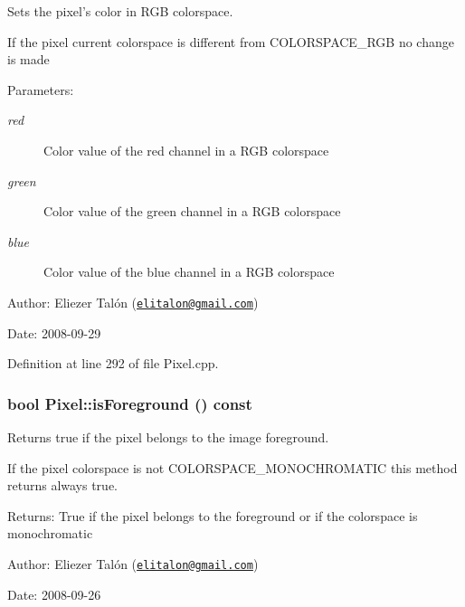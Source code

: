 Sets the pixel's color in RGB colorspace. 

If the pixel current colorspace is different from COLORSPACE\_\-RGB no change is made

\begin{Desc}
\item[Parameters:]
\begin{description}
\item[{\em red}]Color value of the red channel in a RGB colorspace \item[{\em green}]Color value of the green channel in a RGB colorspace \item[{\em blue}]Color value of the blue channel in a RGB colorspace\end{description}
\end{Desc}
\begin{Desc}
\item[Author:]Eliezer Talón (\href{mailto:elitalon@gmail.com}{\tt elitalon@gmail.com}) \end{Desc}
\begin{Desc}
\item[Date:]2008-09-29 \end{Desc}


Definition at line 292 of file Pixel.cpp.\hypertarget{class_pixel_48f2d29f9542f9c2ce293422ab07ffcc}{
\subsubsection[isForeground]{\setlength{\rightskip}{0pt plus 5cm}bool Pixel::isForeground () const}}
\label{class_pixel_48f2d29f9542f9c2ce293422ab07ffcc}


Returns true if the pixel belongs to the image foreground. 

If the pixel colorspace is not COLORSPACE\_\-MONOCHROMATIC this method returns always true.

\begin{Desc}
\item[Returns:]True if the pixel belongs to the foreground or if the colorspace is monochromatic\end{Desc}
\begin{Desc}
\item[Author:]Eliezer Talón (\href{mailto:elitalon@gmail.com}{\tt elitalon@gmail.com}) \end{Desc}
\begin{Desc}
\item[Date:]2008-09-26 \end{Desc}


